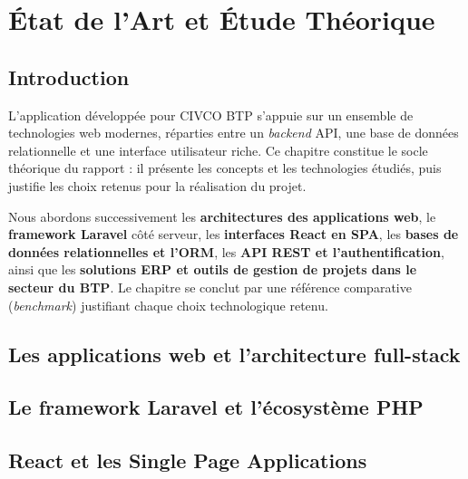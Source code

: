 \chapter{État de l'Art et Étude Théorique}
\label{chap:etat_art}

\section{Introduction}

L'application développée pour CIVCO BTP s'appuie sur un ensemble de technologies web
modernes, réparties entre un \textit{backend} API, une base de données relationnelle et
une interface utilisateur riche. Ce chapitre constitue le socle théorique du rapport :
il présente les concepts et les technologies étudiés, puis justifie les choix retenus
pour la réalisation du projet.

\medskip

Nous abordons successivement les \textbf{architectures des applications web}, le
\textbf{framework Laravel} côté serveur, les \textbf{interfaces React en SPA}, les
\textbf{bases de données relationnelles et l'ORM}, les \textbf{API REST et
l'authentification}, ainsi que les \textbf{solutions ERP et outils de gestion de projets
dans le secteur du BTP}. Le chapitre se conclut par une référence comparative
(\textit{benchmark}) justifiant chaque choix technologique retenu.

\section{Les applications web et l'architecture full-stack}


\section{Le framework Laravel et l'écosystème PHP}


\section{React et les Single Page Applications}


